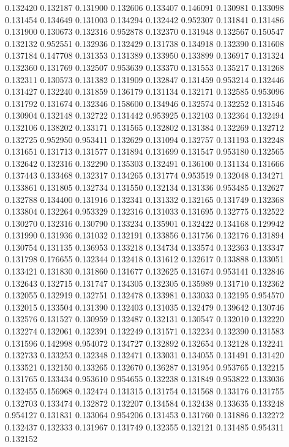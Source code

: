 0.132420
0.132187
0.131900
0.132606
0.133407
0.146091
0.130981
0.133098
0.131454
0.134649
0.131003
0.134294
0.132442
0.952307
0.131841
0.131486
0.131900
0.130673
0.132316
0.952878
0.132370
0.131948
0.132567
0.150547
0.132132
0.952551
0.132936
0.132429
0.131738
0.134918
0.132390
0.131608
0.137184
0.147708
0.131353
0.131389
0.133950
0.133899
0.136917
0.131324
0.132360
0.131769
0.132507
0.953639
0.133370
0.131553
0.135217
0.131268
0.132311
0.130573
0.131382
0.131909
0.132847
0.131459
0.953214
0.132446
0.131427
0.132240
0.131859
0.136179
0.131134
0.132171
0.132585
0.953096
0.131792
0.131674
0.132346
0.158600
0.134946
0.132574
0.132252
0.131546
0.130904
0.132148
0.132722
0.131442
0.953925
0.132103
0.132364
0.132494
0.132106
0.138202
0.133171
0.131565
0.132802
0.131384
0.132269
0.132712
0.132725
0.952950
0.953411
0.132629
0.131094
0.132757
0.131193
0.132248
0.131651
0.131713
0.131577
0.131894
0.131699
0.131547
0.953180
0.132565
0.132642
0.132316
0.132290
0.135303
0.132491
0.136100
0.131134
0.131666
0.137443
0.133468
0.132317
0.134265
0.131774
0.953519
0.132048
0.134271
0.133861
0.131805
0.132734
0.131550
0.132134
0.131336
0.953485
0.132627
0.132788
0.134400
0.131916
0.132341
0.131332
0.132165
0.131749
0.132368
0.133804
0.132264
0.953329
0.132316
0.131033
0.131695
0.132775
0.132522
0.130270
0.132316
0.130790
0.133234
0.135901
0.132422
0.134168
0.129942
0.131990
0.131936
0.131032
0.132191
0.133856
0.131756
0.132176
0.131894
0.130754
0.131135
0.136953
0.133218
0.134734
0.133574
0.132363
0.133347
0.131798
0.176655
0.132344
0.132418
0.131612
0.132617
0.133888
0.133051
0.133421
0.131830
0.131860
0.131677
0.132625
0.131674
0.953141
0.132846
0.132643
0.132715
0.131747
0.134305
0.132305
0.135989
0.131710
0.132362
0.132055
0.132919
0.132751
0.132478
0.133981
0.133033
0.132195
0.954570
0.132015
0.133504
0.131390
0.132403
0.131035
0.132479
0.139642
0.130746
0.132576
0.131527
0.130959
0.132487
0.132131
0.130547
0.132010
0.132220
0.132274
0.132061
0.132391
0.132249
0.131571
0.132234
0.132390
0.131583
0.131596
0.142998
0.954072
0.134727
0.132892
0.132654
0.132128
0.132241
0.132733
0.133253
0.132348
0.132471
0.133031
0.134055
0.131491
0.131420
0.133521
0.132150
0.133265
0.132670
0.136287
0.131954
0.953765
0.132215
0.131765
0.133434
0.953610
0.954655
0.132238
0.131849
0.953822
0.133036
0.132455
0.156968
0.132474
0.131315
0.131754
0.131568
0.133176
0.131755
0.132703
0.133474
0.132872
0.132207
0.134584
0.132438
0.133635
0.133248
0.954127
0.131831
0.133064
0.954206
0.131453
0.131760
0.131886
0.132272
0.132437
0.132333
0.131967
0.131749
0.132355
0.132121
0.131485
0.954311
0.132152
